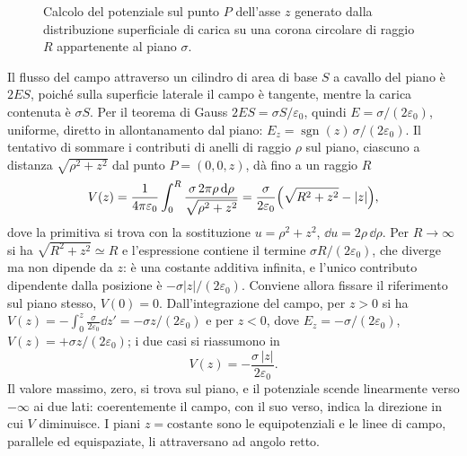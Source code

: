 \documentclass[11pt,a4paper]{article}
\begin{document}
\begin{figure}[htbp]
	\caption{Calcolo del potenziale sul punto $P$ dell'asse $z$ generato dalla distribuzione superficiale di carica su una corona circolare di raggio $R$ appartenente al piano $\sigma$.}
	\label{fig:disco_carico_piano_sigma_3d}
\end{figure}
Il flusso del campo attraverso un cilindro di area di base $S$ a cavallo del piano è $2ES$, poiché sulla superficie laterale il campo è tangente, mentre la carica contenuta è $\sigma S$. Per il teorema di Gauss $2ES=\sigma S/\varepsilon_0$, quindi $E=\sigma/(2\varepsilon_0)$, uniforme, diretto in allontanamento dal piano: $E_z=\operatorname{sgn}(z)\,\sigma/(2\varepsilon_0)$. Il tentativo di sommare i contributi di anelli di raggio $\rho$ sul piano, ciascuno a distanza $\sqrt{\rho^2+z^2}$ dal punto $P=(0,0,z)$, dà fino a un raggio $R$
\[
V(z)=\frac{1}{4\pi\varepsilon_0}\int_0^{R}\frac{\sigma\,2\pi\rho\,\mathrm{d}\rho}{\sqrt{\rho^2+z^2}}=\frac{\sigma}{2\varepsilon_0}\Big(\sqrt{R^2+z^2}-|z|\Big),
\]
dove la primitiva si trova con la sostituzione $u=\rho^2+z^2$, $\dd u=2\rho\,\dd\rho$. Per $R\to\infty$ si ha $\sqrt{R^2+z^2}\simeq R$ e l'espressione contiene il termine $\sigma R/(2\varepsilon_0)$, che diverge ma non dipende da $z$: è una costante additiva infinita, e l'unico contributo dipendente dalla posizione è $-\sigma|z|/(2\varepsilon_0)$. Conviene allora fissare il riferimento sul piano stesso, $V(0)=0$. Dall'integrazione del campo, per $z>0$ si ha $V(z)=-\int_0^z\frac{\sigma}{2\varepsilon_0}\dd z'=-\sigma z/(2\varepsilon_0)$ e per $z<0$, dove $E_z=-\sigma/(2\varepsilon_0)$, $V(z)=+\sigma z/(2\varepsilon_0)$; i due casi si riassumono in
\[
V(z)=-\frac{\sigma\,|z|}{2\varepsilon_0}.
\]
Il valore massimo, zero, si trova sul piano, e il potenziale scende linearmente verso $-\infty$ ai due lati: coerentemente il campo, con il suo verso, indica la direzione in cui $V$ diminuisce. I piani $z=\text{costante}$ sono le equipotenziali e le linee di campo, parallele ed equispaziate, li attraversano ad angolo retto.
\end{document}

